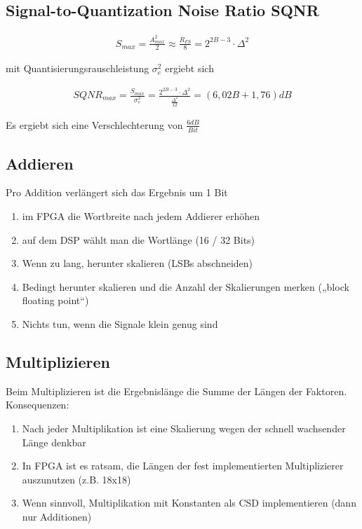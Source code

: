 \documentclass[10pt,a4paper]{article}
\begin{document}
\subsection{Signal-to-Quantization Noise Ratio SQNR}
  \begin{mdframed}[style=exercise]
    \begin{align}
        S_{max} = \frac{A_{max}^2}{2} \approx \frac{R_{FS}}{8} = 2^{2B-3}\cdot \Delta^2
    \end{align}
  \end{mdframed}
mit Quantisierungsrauschleistung $\sigma_e^2$ ergiebt sich
  \begin{mdframed}[style=exercise]
    \begin{align}
        SQNR_{max} = \frac{S_{max}}{\sigma^2_e} = \frac{2^{2B-3}\cdot \Delta^2}{ \frac{\Delta^2}{12} } = (6,02B+1,76)dB
    \end{align}
  \end{mdframed}
Es ergiebt sich eine Verschlechterung von $\frac{6dB}{Bit}$

\subsection{Addieren}
Pro Addition verlängert sich das Ergebnis um 1 Bit
\begin{enumerate}
    \item im FPGA die Wortbreite nach jedem Addierer erhöhen
    \item auf dem DSP wählt man die Wortlänge (16 / 32 Bits)
    \item Wenn zu lang, herunter skalieren (LSBs abschneiden)
    \item Bedingt herunter skalieren und die Anzahl der Skalierungen merken („block floating point“)
    \item Nichts tun, wenn die Signale klein genug sind
\end{enumerate}

\subsection{Multiplizieren}
Beim Multiplizieren ist die Ergebnislänge die Summe der Längen
der Faktoren.\\
Konsequenzen:
\begin{enumerate}
    \item Nach jeder Multiplikation ist eine Skalierung wegen der schnell wachsender Länge denkbar
    \item In FPGA ist es ratsam, die Längen der fest implementierten Multiplizierer auszunutzen (z.B. 18x18)
    \item Wenn sinnvoll, Multiplikation mit Konstanten als CSD implementieren (dann nur Additionen)
\end{enumerate}
\end{document}
